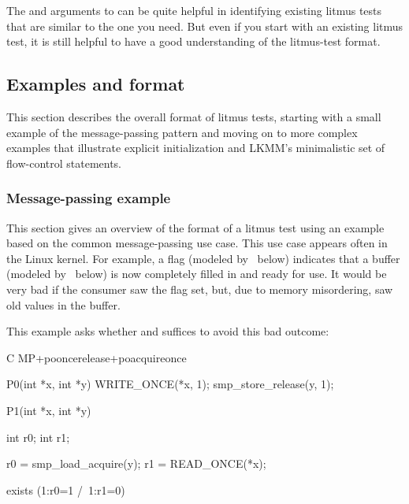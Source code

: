 The  and  arguments to  can be quite helpful
in identifying existing litmus tests that are similar to the one you need.
But even if you start with an existing litmus test, it is still helpful
to have a good understanding of the litmus-test format.


\subsection{Examples and format}

This section describes the overall format of litmus tests, starting
with a small example of the message-passing pattern and moving on to
more complex examples that illustrate explicit initialization and LKMM's
minimalistic set of flow-control statements.


\subsubsection{Message-passing example}

This section gives an overview of the format of a litmus test using an
example based on the common message-passing use case.
This use case appears often in the Linux kernel.
For example, a flag (modeled by~ below) indicates that a buffer
(modeled by~ below) is now completely filled in and ready for use.
It would be very bad if the consumer saw the flag set, but, due to memory
misordering, saw old values in the buffer.

This example asks whether  and 
suffices to avoid this bad outcome:

\begin{fcvlabel}
\begin{VerbatimN}[commandchars=\%\@\$]
	C MP+pooncerelease+poacquireonce  %

	{}    %

	P0(int *x, int *y)   %
	{
		WRITE_ONCE(*x, 1);   %
		smp_store_release(y, 1);   %
	}   %

	P1(int *x, int *y)   %
	{
		int r0;   %
		int r1;   %

		r0 = smp_load_acquire(y);   %
		r1 = READ_ONCE(*x);    %
	}   %

	exists (1:r0=1 /\ 1:r1=0)  %
\end{VerbatimN}
\end{fcvlabel}

